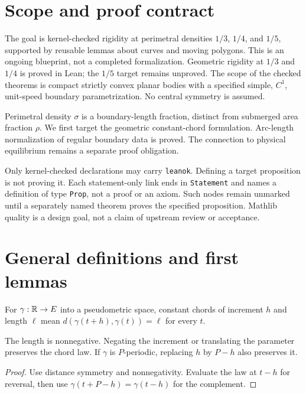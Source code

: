 \section{Scope and proof contract}

The goal is kernel-checked rigidity at perimetral densities $1/3$, $1/4$,
and $1/5$, supported by reusable lemmas about curves and moving polygons.
This is an ongoing blueprint, not a completed formalization. Geometric
rigidity at $1/3$ and $1/4$ is proved in Lean; the $1/5$ target remains
unproved. The scope of the checked theorems is
compact strictly convex planar bodies with a specified simple, $C^1$,
unit-speed boundary parametrization. No central symmetry is assumed.

Perimetral density $\sigma$ is a boundary-length fraction, distinct from
submerged area fraction $\rho$. We first target the geometric constant-chord
formulation. Arc-length normalization of regular boundary data is proved.
The connection to physical equilibrium remains a separate proof obligation.

Only kernel-checked declarations may carry \texttt{leanok}. Defining a
target proposition is not proving it. Each statement-only link ends in
\texttt{Statement} and names a definition of type \texttt{Prop}, not a proof
or an axiom. Such nodes remain unmarked until a separately named theorem
proves the specified proposition. Mathlib quality is a design goal, not a claim
of upstream review or acceptance.

\section{General definitions and first lemmas}

\begin{definition}
\label{def:chord}
\leanok
For $\gamma:\mathbb{R}\to E$ into a pseudometric space, constant chords of increment
$h$ and length $\ell$ mean $d(\gamma(t+h),\gamma(t))=\ell$ for every $t$.
\end{definition}

\begin{lemma}
\label{lem:chord-api}
\leanok
{}
The length is nonnegative. Negating the increment or translating the
parameter preserves the chord law. If $\gamma$ is $P$-periodic, replacing
$h$ by $P-h$ also preserves it.
\end{lemma}
\begin{proof}
\leanok
Use distance symmetry and nonnegativity. Evaluate the law at $t-h$ for
reversal, then use $\gamma(t+P-h)=\gamma(t-h)$ for the complement.
\end{proof}

